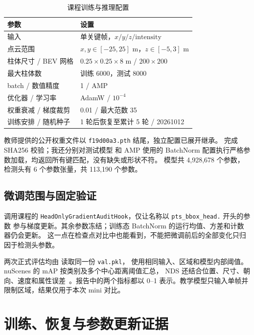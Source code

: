 \documentclass[UTF8,zihao=5,scheme=chinese]{ctexart}
\begin{document}
\begin{table}[htbp]
  \centering
  \caption{课程训练与推理配置}
  \label{tab:config}
  \begin{tabular}{ll}
    \toprule
    参数 & 设置 \\
    \midrule
    输入 & 单关键帧，$x/y/z/\mathrm{intensity}$ \\
    点云范围 & $x,y\in[-25,25]$ m，$z\in[-5,3]$ m \\
    柱体尺寸 / BEV 网格 & $0.25\times0.25\times8$ m / $200\times200$ \\
    最大柱体数 & 训练 6000，测试 8000 \\
    batch / 数值精度 & 1 / AMP \\
    优化器 / 学习率 & AdamW / $10^{-4}$ \\
    权重衰减 / 梯度裁剪 & 0.01 / 最大范数 35 \\
    训练安排 / 随机种子 & 1 轮后恢复至累计 5 轮 / 20261012 \\
    \bottomrule
  \end{tabular}
\end{table}

教师提供的公开权重文件以 \texttt{f19d00a3.pth} 结尾，独立配置已展开继承。
 完成 SHA256 校验；我还分别对测试模型
和 AMP 使用的 BatchNorm 配置执行严格参数加载，均返回所有键匹配，没有缺失或形状不符。
模型共 4,928,678 个参数，检测头有 6 个参数张量，共 113,190 个参数。

\subsection{微调范围与固定验证}

 调用课程的
\texttt{HeadOnlyGradientAuditHook}，仅让名称以 \texttt{pts\_bbox\_head.} 开头的参数
参与梯度更新。其余参数冻结；训练态 BatchNorm 的运行均值、方差和计数器仍会更新。
这一点在检查点对比中也能看到，不能把微调前后的全部变化只归因于检测头参数。

两次正式评估均由  读取同一份 \texttt{val.pkl}，
使用相同输入、区域和模型内部阈值。nuScenes 的 mAP 按类别及多个中心距离阈值汇总，
NDS 还结合位置、尺寸、朝向、速度和属性误差~\cite{nuscenes}。报告中的两个指标都以
0--1 表示。教学模型只输入单帧并限制区域，结果仅用于本次 mini 对比。

\section{训练、恢复与参数更新证据}
\end{document}
